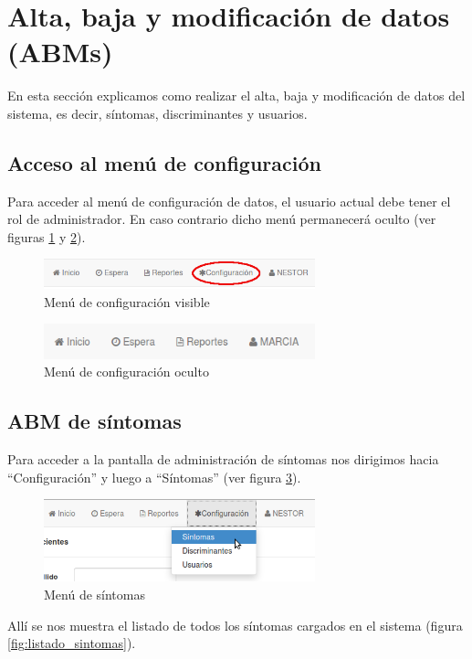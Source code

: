 \section{Alta, baja y modificación de datos (ABMs)}
En esta sección explicamos como realizar el alta, baja y modificación de datos del sistema, es decir, síntomas, discriminantes y usuarios.

\subsection{Acceso al menú de configuración}
Para acceder al menú de configuración de datos, el usuario actual debe tener el rol de administrador. En caso contrario dicho menú permanecerá oculto (ver figuras \ref{fig:menu_conf_visible} y \ref{fig:menu_conf_oculto}).

\begin{figure}
\centerline{\includegraphics[width=0.7\textwidth]{menu_configuracion_visible.png}}
\caption{Menú de configuración visible}
\label{fig:menu_conf_visible}
\end{figure}

\begin{figure}
\centerline{\includegraphics[width=0.7\textwidth]{menu_configuracion_oculto.png}}
\caption{Menú de configuración oculto}
\label{fig:menu_conf_oculto}
\end{figure}

\subsection{ABM de síntomas}
Para acceder a la pantalla de administración de síntomas nos dirigimos hacia ``Configuración'' y luego a ``Síntomas'' (ver figura \ref{fig:menu_sintomas}).
\begin{figure}
\centerline{\includegraphics[width=0.7\textwidth]{menu_sintomas.png}}
\caption{Menú de síntomas}
\label{fig:menu_sintomas}
\end{figure}
Allí se nos muestra el listado de todos los síntomas cargados en el sistema (figura \ref{fig:listado_sintomas}).

